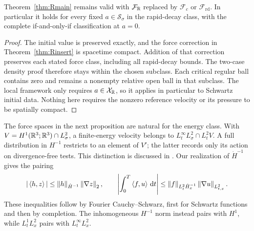 \begin{corollary}\label{cor:Rclasses}
Theorem~\ref{thm:Rmain} remains valid with $\mathcal F_{\mathbb R}$ replaced by $\mathcal F_c$ or $\mathcal F_{\mathrm{rd}}$. In particular it holds for every fixed $a\in\mathcal S_\sigma$ in the rapid-decay class, with the complete if-and-only-if classification at $a=0$.
\end{corollary}
\begin{proof}
The initial value is preserved exactly, and the force correction in Theorem~\ref{thm:Rinsert} is spacetime compact. Addition of that correction preserves each stated force class, including all rapid-decay bounds. The two-case density proof therefore stays within the chosen subclass. Each critical regular ball contains zero and remains a nonempty relative open ball in that subclass. The local framework only requires $a\in\mathcal X_{\mathbb R}$, so it applies in particular to Schwartz initial data. Nothing here requires the nonzero reference velocity or its pressure to be spatially compact.
\end{proof}

The force spaces in the next proposition are natural for the energy
class. With $V=H^1(\mathbb R^3;\mathbb R^3)\cap L^2_\sigma$, a finite-energy velocity
belongs to $L^\infty_tL^2_\sigma\cap L^2_tV$. A full distribution in
$H^{-1}$ restricts to an element of $V'$; the latter records only its
action on divergence-free tests. This distinction is discussed in
\cite[Definition~1 and Remark~4]{berselli}. Our realization of
$\dot H^{-1}$ gives the pairing
\[
 |\left\langle h,z\right\rangle|\le\left\lVert h\right\rVert_{\dot H^{-1}}\left\lVert\nabla z\right\rVert_2,
 \qquad
 \left|\int_0^T\left\langle f,u\right\rangle\,\mathrm d t\right|
 \le\left\lVert f\right\rVert_{L^2_t\dot H^{-1}_x}\left\lVert\nabla u\right\rVert_{L^2_{t,x}}.
\]
These inequalities follow by Fourier Cauchy--Schwarz, first for Schwartz
functions and then by completion. The inhomogeneous $H^{-1}$ norm instead
pairs with $H^1$, while $L^1_tL^2_x$ pairs with $L^\infty_tL^2_x$.

